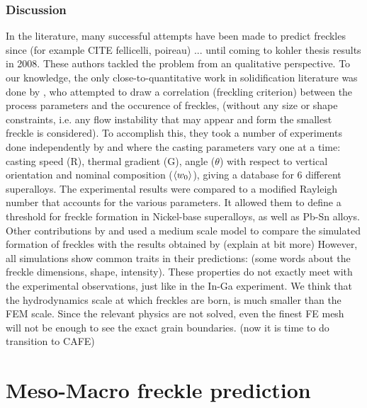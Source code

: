\subsubsection{Discussion}
In the literature, many successful attempts have been made to predict freckles since (for example CITE fellicelli, poireau) ... 
until coming to kohler thesis results in 2008. These authors tackled the problem from an qualitative perspective. 
To our knowledge, the only close-to-quantitative work in solidification literature was done by \citet{ramirez_evaluation_2003}, 
who attempted to draw a correlation (freckling criterion) between the process parameters and the occurence of freckles, 
(without any size or shape constraints, i.e. any flow instability that may appear and form the smallest freckle is considered). 
To accomplish this, they took a number of experiments done independently by \citet{pollock_breakdown_1996} and \citet{auburtin_freckle_2000} 
where the casting parameters vary one at a time: casting speed (R), thermal gradient (G), angle ($\theta$) with respect to vertical 
orientation and nominal composition ($\langle w_0 \rangle$), giving a database for 6 different superalloys. The experimental results were 
compared to a modified Rayleigh number that accounts for the various parameters. It allowed them to define a threshold for freckle 
formation in Nickel-base superalloys, as well as Pb-Sn alloys.
Other contributions by \citet{yuan_new_2012} and  \citet{karagadde_3-d_2014} used a medium scale model to compare the simulated 
formation of freckles with the results obtained by \citet{shevchenko_chimney_2013} (explain at bit more)
However, all simulations show common traits in their predictions: (some words about the freckle dimensions, 
shape, intensity). These properties do not exactly meet with the experimental observations, just like in the 
In-Ga experiment. We think that the hydrodynamics scale at which freckles are born, is much smaller than the 
FEM scale. Since the relevant physics are not solved, even the finest FE mesh will not
be enough to see the exact grain boundaries. (now it is time to do transition to CAFE)
%
\section{Meso-Macro freckle prediction}
%
